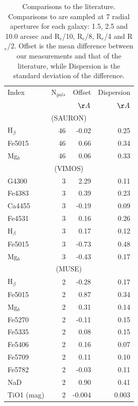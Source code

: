 	\begin{table}
		\centering
		\caption{Comparisons to the literature. Comparisons to \citet{Rampazzo2005} are sampled at 7 radial apertures for each galaxy: 1.5, 2.5 and 10.0 arcsec and R$_e$/10, R$_e$/8, R$_e$/4 and R$_e$/2. Offset is the mean difference between our measurements and that of the literature, while Dispersion is the standard deviation of the difference.}
		\label{tab:litAbsorption}
		\begin{tabular}{l r r r}
			\hline
			\hline
			Index 		& N$_{gals}$ & Offset 	& Dispersion \\
						& 			& $\AA$		& $\AA$ \\
			\hline
			\multicolumn{4}{c}{\citet{Vazdekis2010} (SAURON)} \\
			\hline
			H$_\beta$ 	& 46		& -0.02		& 0.25	\\
			Fe5015		& 46		& 0.66		& 0.34	\\
			Mg$_b$ 		& 46		& 0.06		& 0.33	\\
			\hline
			\multicolumn{4}{c}{\citet{Rampazzo2005} (VIMOS)} \\
			\hline
			G4300 		& 3 		& 2.29		& 0.11	\\
			Fe4383 		& 3 		& 0.39		& 0.23	\\
			Ca4455 		& 3 		& -0.19		& 0.09	\\
			Fe4531 		& 3 		& 0.16		& 0.26	\\
			H$_\beta$ 	& 3 		& 0.17		& 0.12	\\
			Fe5015 		& 3 		& -0.73		& 0.48	\\
			Mg$_b$ 		& 3 		& -0.43		& 0.17	\\
			\hline
			\multicolumn{4}{c}{\citet{Rampazzo2005} (MUSE)} \\
			\hline
			H$_\beta$ 	& 2 		& -0.28		& 0.17	\\ 
			Fe5015 		& 2 		& 0.87		& 0.34	\\ 
			Mg$_b$ 		& 2 		& 0.31		& 0.14	\\
			Fe5270 		& 2 		& -0.11		& 0.15	\\
			Fe5335 		& 2 		& 0.08		& 0.15	\\
			Fe5406 		& 2 		& 0.16		& 0.07	\\
			Fe5709 		& 2 		& 0.11		& 0.10	\\
			Fe5782 		& 2 		& -0.03		& 0.11	\\
			NaD 		& 2 		& 0.90		& 0.41	\\
			TiO1 (mag)	& 2 		& -0.004	& 0.003	\\

\end{tabular}
\end{table}

